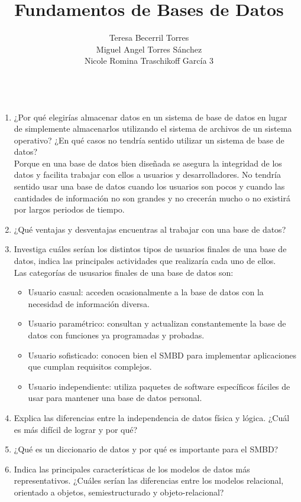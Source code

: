 \documentclass{article}
\title{Fundamentos de Bases de Datos}
\author{Teresa Becerril Torres\\
            Miguel Angel Torres Sánchez\\
            Nicole Romina Traschikoff García 3\\
            \\}
\begin{document}
        \maketitle
        \vspace{.4cm}
        \begin{enumerate}
          \item ¿Por qué elegirías almacenar datos en un sistema de base de datos en lugar de simplemente almacenarlos utilizando el sistema de archivos de un sistema operativo? ¿En qué casos no tendría sentido utilizar un sistema de base de datos?\\
	 Porque en una base de datos bien diseñada se asegura la integridad de los datos y facilita trabajar con ellos a usuarios y desarrolladores. No tendría sentido usar una base de datos cuando los usuarios son pocos y cuando las cantidades de información no son grandes y no crecerán mucho o no existirá por largos periodos de tiempo.
          \item ¿Qué ventajas y desventajas encuentras al trabajar con una base de datos?
          \item Investiga cuáles serían los distintos tipos de usuarios finales de una base de datos, indica las principales actividades que realizaría cada uno de ellos.\\
	Las categorías de ususarios finales de una base de datos son:

	\begin{itemize}
		\item Usuario casual: acceden ocasionalmente a la base de datos con la necesidad de información diversa.
		\item Usuario paramétrico: consultan y actualizan constantemente la base de datos con funciones ya programadas y probadas.
		\item Usuario sofisticado: conocen bien el SMBD para implementar aplicaciones que cumplan requisitos complejos.
		\item Usuario independiente: utiliza paquetes de software específicos fáciles de usar para mantener una base de datos personal.
	\end{itemize}

          \item Explica las diferencias entre la independencia de datos física y lógica. ¿Cuál es más difícil de lograr y por qué?
          \item ¿Qué es un diccionario de datos y por qué es importante para el SMBD?
          \item Indica las principales características de los modelos de datos más representativos. ¿Cuáles serían las diferencias entre los modelos relacional, orientado a objetos, semiestructurado y objeto-relacional?
	\begin{itemize}
		

\end{itemize}
\end{enumerate}
\end{document}
